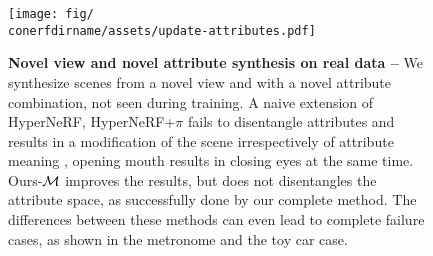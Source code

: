 \begin{figure}
  \centering
  \texttt{[image: fig/\\conerfdirname/assets/update-attributes.pdf]}
  \caption{{\bf Novel view and novel attribute synthesis on real data --}
    We synthesize scenes from a novel view and with a novel attribute
    combination, not seen during training.
    A naive extension of HyperNeRF, HyperNeRF{+}$\pi$ fails to disentangle
    attributes and results in a modification of the scene irrespectively of
    attribute meaning \eg, opening mouth results in closing eyes at the same
    time.
    Ours-$\mathcal{M}$ improves the results, but does not disentangles the
    attribute space, as successfully done by our complete method.
    The differences between these methods can even lead to complete failure
    cases, as shown in the metronome and the toy car case.
  }
  \label{fig:conerf-novel_view}
\end{figure}